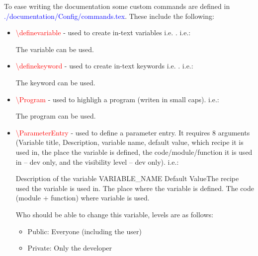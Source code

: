 To ease writing the documentation some custom commands are defined in \textcolor{blue}{./documentation/Config/commands.tex}. These include the following:
\begin{itemize}
	\item \textcolor{red}{\textbackslash{definevariable}} - used to create in-text variables i.e. . i.e.:
	\begin{latexbox}
	The variable  can be used.
	\end{latexbox}


	\item \textcolor{red}{\textbackslash{definekeyword}} - used to create in-text keywords i.e. . i.e.:
	\begin{latexbox}
	The keyword  can be used.
	\end{latexbox}


	\item \textcolor{red}{\textbackslash{Program}} - used to highligh a program (writen in small caps). i.e.:
	\begin{latexbox}
	The program  can be used.
	\end{latexbox}

	\newpage

	\item \begin{minipage}[t]{\textwidth} 
	\textcolor{red}{\textbackslash{ParameterEntry}} - used to define a parameter entry. It requires 8 arguments (Variable title, Description, variable name, default value, which recipe it is used in, the place the variable is defined, the code/module/function it is used in -- dev only, and the visibility level -- dev only). i.e.:
	\begin{latexbox}
	\ParameterEntry{Variable title}
	{Description of the variable}
	{VARIABLE\_NAME}
	{Default Value}{The recipe used the variable is used in.}
	{The place where the variable is defined.}
	{The code (module + function) where variable is used.}
	{
	Who should be able to change this variable, levels are as follows:
	\begin{itemize}
		\item Public: Everyone (including the user)
		\item Private: Only the developer
	\end{itemize}
	}
	\end{latexbox}
	\end{minipage}


\end{itemize}
